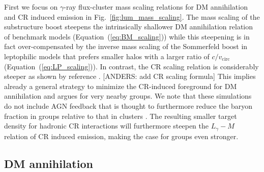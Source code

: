\documentclass[10pt,aps,pra,reprint,amsmath,amsfonts,amssymb,showpacs]{revtex4-1}
\begin{document}
First we focus on $\gamma$-ray flux-cluster mass scaling relations for DM
annihilation and CR induced emission in Fig.~\ref{fig:lum_mass_scaling}.  The
mass scaling of the substructure boost steepens the intrinsically shallower DM
annihilation relation of benchmark models (Equation~(\ref{eq:BM_scaling})) while
this steepening is in fact over-compensated by the inverse mass scaling of the
Sommerfeld boost in leptophilic models that prefers smaller halos with a larger
ratio of $c/v_\mathrm{circ}$ (Equation~(\ref{eq:LP_scaling})). In contrast, the
CR scaling relation is considerably steeper as shown by reference
\cite{2010MNRAS.409..449P}. [ANDERS: add CR scaling formula] This implies
already a general strategy to minimize the CR-induced foreground for DM
annihilation and argues for very nearby groups. We note that these simulations
do not include AGN feedback that is thought to furthermore reduce the baryon
fraction in groups relative to that in clusters \cite{2008ApJ...687L..53P}. The
resulting smaller target density for hadronic CR interactions will furthermore
steepen the $L_\gamma-M$ relation of CR induced emission, making the case for
groups even stronger.

\subsection{DM annihilation}
\end{document}
